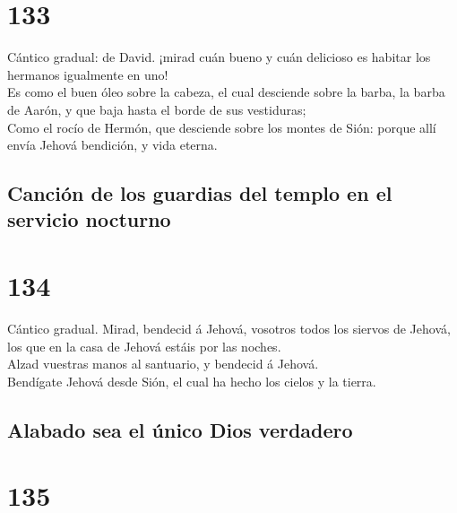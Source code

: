 \hypertarget{section-132}{%
\section{133}\label{section-132}}

 Cántico gradual: de David. ¡mirad cuán bueno y cuán
delicioso es habitar los hermanos igualmente en uno!\\
 Es como el buen óleo sobre la cabeza, el cual desciende
sobre la barba, la barba de Aarón, y que baja hasta el borde de sus
vestiduras;\\
 Como el rocío de Hermón, que desciende sobre los montes
de Sión: porque allí envía Jehová bendición, y vida eterna.

\hypertarget{canciuxf3n-de-los-guardias-del-templo-en-el-servicio-nocturno}{%
\subsection{Canción de los guardias del templo en el servicio
nocturno}\label{canciuxf3n-de-los-guardias-del-templo-en-el-servicio-nocturno}}

\hypertarget{section-133}{%
\section{134}\label{section-133}}

 Cántico gradual. Mirad, bendecid á Jehová, vosotros todos
los siervos de Jehová, los que en la casa de Jehová estáis por las
noches.\\
 Alzad vuestras manos al santuario, y bendecid á Jehová.\\
 Bendígate Jehová desde Sión, el cual ha hecho los cielos
y la tierra.

\hypertarget{alabado-sea-el-uxfanico-dios-verdadero}{%
\subsection{Alabado sea el único Dios
verdadero}\label{alabado-sea-el-uxfanico-dios-verdadero}}

\hypertarget{section-134}{%
\section{135}\label{section-134}}

